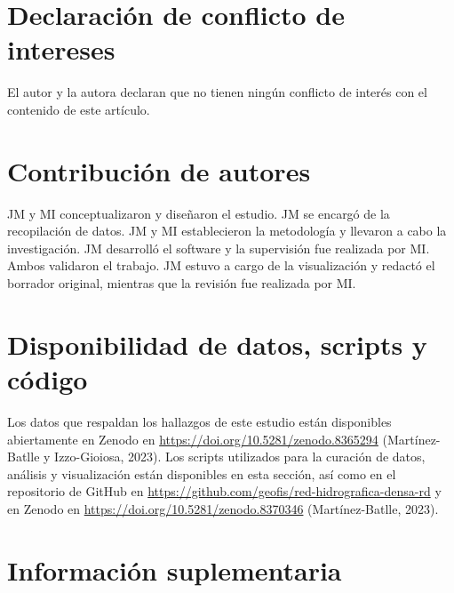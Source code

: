 \documentclass[spanish]{article}
\begin{document}
\hypertarget{declaraciuxf3n-de-conflicto-de-intereses}{%
\section*{Declaración de conflicto de
intereses}\label{declaraciuxf3n-de-conflicto-de-intereses}}

El autor y la autora declaran que no tienen ningún conflicto de interés
con el contenido de este artículo.

\hypertarget{contribuciuxf3n-de-autores}{%
\section{Contribución de autores}\label{contribuciuxf3n-de-autores}}

JM y MI conceptualizaron y diseñaron el estudio. JM se encargó de la
recopilación de datos. JM y MI establecieron la metodología y llevaron a
cabo la investigación. JM desarrolló el software y la supervisión fue
realizada por MI. Ambos validaron el trabajo. JM estuvo a cargo de la
visualización y redactó el borrador original, mientras que la revisión
fue realizada por MI.

\hypertarget{disponibilidad-de-datos-scripts-y-cuxf3digo}{%
\section*{Disponibilidad de datos, scripts y
código}\label{disponibilidad-de-datos-scripts-y-cuxf3digo}}

Los datos que respaldan los hallazgos de este estudio están disponibles
abiertamente en Zenodo en \url{https://doi.org/10.5281/zenodo.8365294}
(Martínez-Batlle y Izzo-Gioiosa, 2023). Los scripts utilizados para la
curación de datos, análisis y visualización están disponibles en esta
sección, así como en el repositorio de GitHub en
\url{https://github.com/geofis/red-hidrografica-densa-rd} y en Zenodo en
\url{https://doi.org/10.5281/zenodo.8370346} (Martínez-Batlle, 2023).

\newpage

\hypertarget{infosupl}{%
\section*{Información suplementaria}\label{infosupl}}
\end{document}
